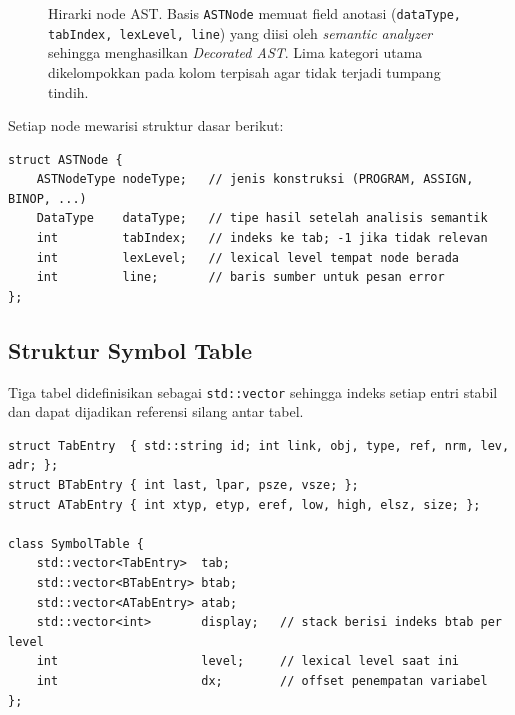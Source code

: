 \documentclass[11pt,a4paper]{article}
\begin{document}
\begin{figure}[H]
\caption{Hirarki node AST. Basis \texttt{ASTNode} memuat field anotasi
(\texttt{dataType, tabIndex, lexLevel, line}) yang diisi oleh
\textit{semantic analyzer} sehingga menghasilkan \textit{Decorated AST}. Lima
kategori utama dikelompokkan pada kolom terpisah agar tidak terjadi tumpang
tindih.}
\label{fig:ast-hier}
\end{figure}

Setiap node mewarisi struktur dasar berikut:

\begin{lstlisting}
struct ASTNode {
    ASTNodeType nodeType;   // jenis konstruksi (PROGRAM, ASSIGN, BINOP, ...)
    DataType    dataType;   // tipe hasil setelah analisis semantik
    int         tabIndex;   // indeks ke tab; -1 jika tidak relevan
    int         lexLevel;   // lexical level tempat node berada
    int         line;       // baris sumber untuk pesan error
};
\end{lstlisting}

\subsection{Struktur Symbol Table}

Tiga tabel didefinisikan sebagai \texttt{std::vector} sehingga indeks setiap
entri stabil dan dapat dijadikan referensi silang antar tabel.

\begin{lstlisting}
struct TabEntry  { std::string id; int link, obj, type, ref, nrm, lev, adr; };
struct BTabEntry { int last, lpar, psze, vsze; };
struct ATabEntry { int xtyp, etyp, eref, low, high, elsz, size; };

class SymbolTable {
    std::vector<TabEntry>  tab;
    std::vector<BTabEntry> btab;
    std::vector<ATabEntry> atab;
    std::vector<int>       display;   // stack berisi indeks btab per level
    int                    level;     // lexical level saat ini
    int                    dx;        // offset penempatan variabel
};
\end{lstlisting}
\end{document}
